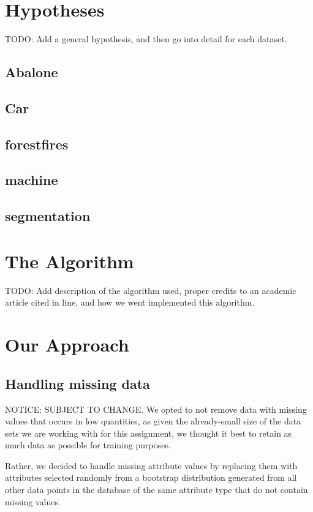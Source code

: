 \documentclass[twoside,11pt]{article}
\begin{document}
\section{Hypotheses}

TODO: Add a general hypothesis, and then go into detail for each dataset.

\subsection{Abalone}

\subsection{Car}

\subsection{forestfires}

\subsection{machine}

\subsection{segmentation}

\section{The Algorithm}
TODO: Add description of the algorithm used, proper credits to an academic article cited in line, and how we went implemented this algorithm.

\section{Our Approach}
\subsection{Handling missing data} NOTICE: SUBJECT TO CHANGE.
 We opted to not remove data with missing values that occurs in low quantities, as given the already-small size of the data sets we are working with for this assignment, we thought it best to retain as much data as possible for training purposes. 

Rather, we decided to handle missing attribute values by replacing them with attributes selected randomly from a bootstrap distribution generated from all other data points in the database of the same attribute type that do not contain missing values. 
\end{document}
